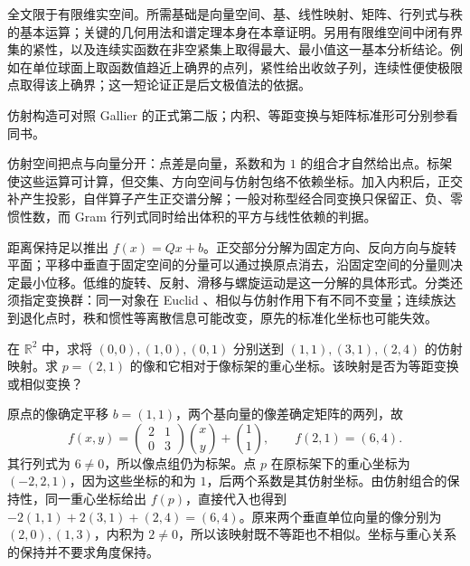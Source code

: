 \ProseParagraphBreak

全文限于有限维实空间。所需基础是向量空间、基、线性映射、矩阵、行列式与秩的基本运算；关键的几何用法和谱定理本身在本章证明。另用有限维空间中闭有界集的紧性，以及连续实函数在非空紧集上取得最大、最小值这一基本分析结论。例如在单位球面上取函数值趋近上确界的点列，紧性给出收敛子列，连续性便使极限点取得该上确界；这一短论证正是后文极值法的依据。

\ProseParagraphBreak

仿射构造可对照 Gallier 的正式第二版\cite[第2.1--2.8, 2.10--2.11节]{Gallier2011Geometric}；内积、等距变换与矩阵标准形可分别参看同书\cite[第6.1--6.4, 8.1--8.2, 8.4--8.7, 12.3--12.4节]{Gallier2011Geometric}。






\begin{chaptersummary}
	仿射空间把点与向量分开：点差是向量，系数和为 \(1\) 的组合才自然给出点。标架使这些运算可计算，但交集、方向空间与仿射包络不依赖坐标。加入内积后，正交补产生投影，自伴算子产生正交谱分解；一般对称型经合同变换只保留正、负、零惯性数，而 Gram 行列式同时给出体积的平方与线性依赖的判据。

	\ProseParagraphBreak

	距离保持足以推出 \(f(x)=Qx+b\)。正交部分分解为固定方向、反向方向与旋转平面；平移中垂直于固定空间的分量可以通过换原点消去，沿固定空间的分量则决定最小位移。低维的旋转、反射、滑移与螺旋运动是这一分解的具体形式。分类还须指定变换群：同一对象在 Euclid 、相似与仿射作用下有不同不变量；连续族达到退化点时，秩和惯性等离散信息可能改变，原先的标准化坐标也可能失效。
\end{chaptersummary}

\BookExercises

\begin{exercise}\label{g1:ex:prescribed-affine-map}
	在 \(\mathbb R^2\) 中，求将 \((0,0),(1,0),(0,1)\) 分别送到 \((1,1),(3,1),(2,4)\) 的仿射映射。求 \(p=(2,1)\) 的像和它相对于像标架的重心坐标。该映射是否为等距变换或相似变换？
\end{exercise}
\begin{solution}
	原点的像确定平移 \(b=(1,1)\)，两个基向量的像差确定矩阵的两列，故
	\[
		f(x,y)=\begin{pmatrix}2&1\\0&3\end{pmatrix}\binom{x}{y}+\binom11,
		\qquad f(2,1)=(6,4).
	\]
	其行列式为 \(6\ne0\)，所以像点组仍为标架。点 \(p\) 在原标架下的重心坐标为 \((-2,2,1)\)，因为这些坐标的和为 \(1\)，后两个系数是其仿射坐标。由仿射组合的保持性，同一重心坐标给出 \(f(p)\)，直接代入也得到 \(-2(1,1)+2(3,1)+(2,4)=(6,4)\)。原来两个垂直单位向量的像分别为 \((2,0),(1,3)\)，内积为 \(2\ne0\)，所以该映射既不等距也不相似。坐标与重心关系的保持并不要求角度保持。
\end{solution}

